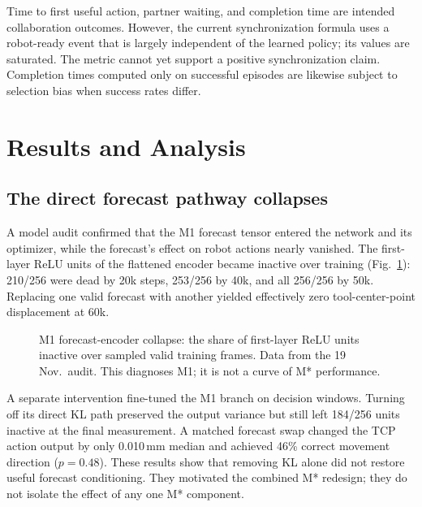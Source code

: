 \documentclass[conference]{IEEEtran}
\begin{document}
Time to first useful action, partner waiting, and completion time are intended collaboration outcomes. However, the current synchronization formula uses a robot-ready event that is largely independent of the learned policy; its values are saturated. The metric cannot yet support a positive synchronization claim. Completion times computed only on successful episodes are likewise subject to selection bias when success rates differ.

\section{Results and Analysis}
\subsection{The direct forecast pathway collapses}
A model audit confirmed that the M1 forecast tensor entered the network and its optimizer, while the forecast's effect on robot actions nearly vanished. The first-layer ReLU units of the flattened encoder became inactive over training (Fig.~\ref{fig:collapse}): 210/256 were dead by 20k steps, 253/256 by 40k, and all 256/256 by 50k. Replacing one valid forecast with another yielded effectively zero tool-center-point displacement at 60k.

\begin{figure}[t]
\centering
{}
\caption{M1 forecast-encoder collapse: the share of first-layer ReLU units inactive over sampled valid training frames. Data from the 19 Nov.\ audit. This diagnoses M1; it is not a curve of M* performance.}
\label{fig:collapse}
\end{figure}

A separate intervention fine-tuned the M1 branch on decision windows. Turning off its direct KL path preserved the output variance but still left 184/256 units inactive at the final measurement. A matched forecast swap changed the TCP action output by only 0.010\,mm median and achieved 46\% correct movement direction ($p=0.48$). These results show that removing KL alone did not restore useful forecast conditioning. They motivated the combined M* redesign; they do not isolate the effect of any one M* component.
\end{document}
